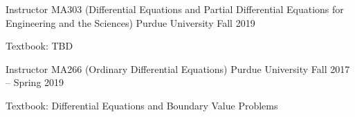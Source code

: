 

\begin{cventries}

  \cventry
    {Instructor} %
    {MA303 (Differential Equations and Partial Differential Equations for
      Engineering and the Sciences)} %
    {Purdue University} %
    {Fall 2019} %
    {
      \begin{cvitems} %
        \item {Textbook: TBD}
      \end{cvitems}
    }

  \cventry
    {Instructor} %
    {MA266 (Ordinary Differential Equations)} %
    {Purdue University} %
    {Fall 2017 -- Spring 2019} %
    {
      \begin{cvitems} %
        \item {Textbook: Differential Equations and Boundary Value Problems}
      \end{cvitems}
    }

\end{cventries}
